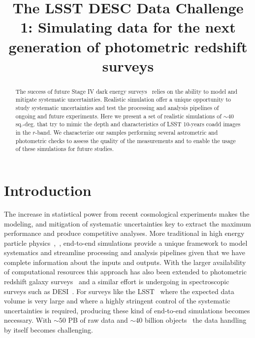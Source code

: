 \documentclass[\docopts]{\docclass}
\begin{document}
\title{ The LSST DESC Data Challenge 1: Simulating data for the next generation of photometric redshift surveys }

\maketitlepre

\begin{abstract}

The success of future Stage IV dark energy surveys~\citep{2006astro.ph..9591A} relies on the ability to model and mitigate
systematic uncertainties. Realistic simulation offer a unique opportunity to study systematic uncertainties and test the
processing and analysis pipelines of ongoing and future experiments. Here we present a set of realistic simulations
of $\sim 40$ sq.-deg. that try to mimic the depth and characteristics of LSST 10-years coadd images in the $r$-band.
We characterize our samples performing several astrometric and photometric checks to assess the quality of the
measurements and to enable the usage of these simulations for future studies.

\end{abstract}


\maketitlepost

%

\section{Introduction}
\label{sec:intro}

The increase in statistical power from recent cosmological experiments makes the modeling, and mitigation of systematic
uncertainties key to extract the maximum performance and produce competitive analyses. More traditional in high energy
particle physics~\citep{Brun:118715},~\citep{2006JHEP...05..026S}, end-to-end simulations provide a unique framework to
model systematics and streamline processing and analysis pipelines given that we have complete information about the inputs
and outputs. With the larger availability of computational resources this approach has also been extended to photometric
redshift galaxy surveys~\citep{2016MNRAS.457..786S,2016ApJ...817...25B} and a similar effort is undergoing in spectroscopic
surveys such as DESI~\citep{2016arXiv161100036D}. For surveys like the LSST~\citep{2008arXiv0805.2366I} where the expected
data volume is very large and where a highly stringent control of the systematic uncertainties is required, producing these
kind of end-to-end simulations becomes necessary. With $\sim 50$ PB of raw data and $\sim 40$ billion objects~\citep{2008arXiv0805.2366I}
the data handling by itself becomes challenging. 
\end{document}
